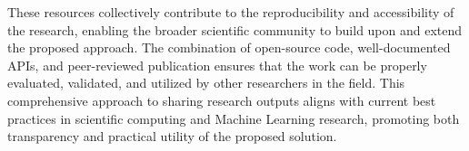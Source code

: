 These resources collectively contribute to the reproducibility and
accessibility of the research, enabling the broader scientific community
to build upon and extend the proposed approach. The combination of
open-source code, well-documented APIs, and peer-reviewed publication
ensures that the work can be properly evaluated, validated, and
utilized by other researchers in the field. This comprehensive approach
to sharing research outputs aligns with current best practices in
scientific computing and Machine Learning research, promoting both
transparency and practical utility of the proposed solution.